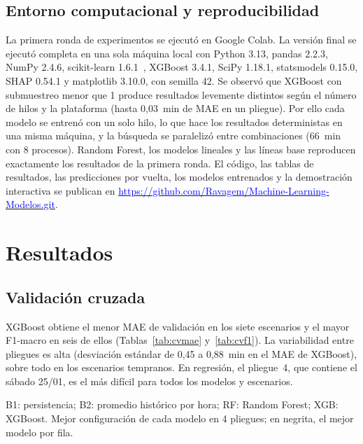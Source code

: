 \documentclass[conference]{IEEEtran}
\newcommand{\tablesize}{\fontsize{7}{8.4}\selectfont}
\newcommand{\ajustar}[1]{%
  \sbox{\tabbox}{#1}%
  \ifdim\wd\tabbox>\columnwidth
    \typeout{AVISO-TABLA: tabla mas ancha que la columna (\the\wd\tabbox\space > \the\columnwidth); se reduce}%
    \resizebox{\columnwidth}{!}{\usebox{\tabbox}}%
  \else
    \usebox{\tabbox}%
  \fi}
\newcommand{\tabla}[1]{\tablesize\setlength{\tabcolsep}{2pt}\ajustar{}}
\begin{document}
\subsection{Entorno computacional y reproducibilidad}
La primera ronda de experimentos se ejecutó en Google Colab. La versión final se ejecutó completa en una sola máquina local con Python 3.13, pandas 2.2.3, NumPy 2.4.6, scikit-learn 1.6.1~\cite{pedregosa2011}, XGBoost 3.4.1, SciPy 1.18.1, statsmodels 0.15.0, SHAP 0.54.1 y matplotlib 3.10.0, con semilla 42. Se observó que XGBoost con submuestreo menor que 1 produce resultados levemente distintos según el número de hilos y la plataforma (hasta 0,03~min de MAE en un pliegue). Por ello cada modelo se entrenó con un solo hilo, lo que hace los resultados deterministas en una misma máquina, y la búsqueda se paralelizó entre combinaciones (66~min con 8 procesos). Random Forest, los modelos lineales y las líneas base reproducen exactamente los resultados de la primera ronda. El código, las tablas de resultados, las predicciones por vuelta, los modelos entrenados y la demostración interactiva se publican en \href{https://github.com/Ravagem/Machine-Learning-Modelos.git}{\textcolor{blue}{https://github.com/Ravagem/Machine-Learning-Modelos.git}}.

\section{Resultados}\label{sec:res}

\subsection{Validación cruzada}
XGBoost obtiene el menor MAE de validación en los siete escenarios y el mayor F1-macro en seis de ellos (Tablas~\ref{tab:cvmae} y~\ref{tab:cvf1}). La variabilidad entre pliegues es alta (desviación estándar de 0,45 a 0,88~min en el MAE de XGBoost), sobre todo en los escenarios tempranos. En regresión, el pliegue~4, que contiene el sábado 25/01, es el más difícil para todos los modelos y escenarios.

\begin{table}[!t]
\centering
\caption{MAE (min) en validación cruzada (media $\pm$ desv. est.)}\label{tab:cvmae}
\tabla{t_cv_mae}

\vspace{2pt}\raggedright\scriptsize B1: persistencia; B2: promedio histórico por hora; RF: Random Forest; XGB: XGBoost. Mejor configuración de cada modelo en 4 pliegues; en negrita, el mejor modelo por fila.
\end{table}
\end{document}
